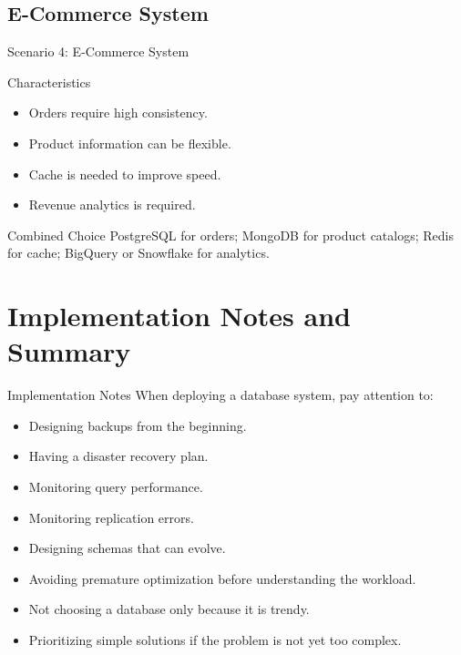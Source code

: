 \documentclass[aspectratio=169,11pt]{beamer}
\newcommand{\smallitem}{\setlength{\itemsep}{2pt}\setlength{\parskip}{0pt}}
\begin{document}
\subsection{E-Commerce System}
\begin{frame}{Scenario 4: E-Commerce System}
\begin{block}{Characteristics}
\begin{itemize}
  \smallitem
  \item Orders require high consistency.
  \item Product information can be flexible.
  \item Cache is needed to improve speed.
  \item Revenue analytics is required.
\end{itemize}
\end{block}

\begin{exampleblock}{Combined Choice}
PostgreSQL for orders; MongoDB for product catalogs; Redis for cache; BigQuery or Snowflake for analytics.
\end{exampleblock}
\end{frame}

\section{Implementation Notes and Summary}

\begin{frame}{Implementation Notes}
When deploying a database system, pay attention to:
\begin{itemize}
  \smallitem
  \item Designing backups from the beginning.
  \item Having a disaster recovery plan.
  \item Monitoring query performance.
  \item Monitoring replication errors.
  \item Designing schemas that can evolve.
  \item Avoiding premature optimization before understanding the workload.
  \item Not choosing a database only because it is trendy.
  \item Prioritizing simple solutions if the problem is not yet too complex.
\end{itemize}
\end{frame}
\end{document}
